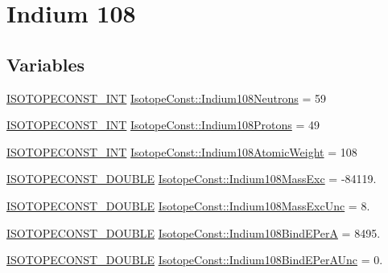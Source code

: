 \hypertarget{group___isotope_const-_indium-_in108}{}\section{Indium 108}
\label{group___isotope_const-_indium-_in108}
\subsection*{Variables}
\begin{DoxyCompactItemize}
\item 
\mbox{\hyperlink{group___isotope_const-_macros_ga5f18360b3e99483a35c32d789e62621c}{I\+S\+O\+T\+O\+P\+E\+C\+O\+N\+S\+T\+\_\+\+I\+NT}} \mbox{\hyperlink{group___isotope_const-_indium-_in108_ga9cdebc94fcaac56b9bc00c0afaffdd4a}{Isotope\+Const\+::\+Indium108\+Neutrons}} = 59
\item 
\mbox{\hyperlink{group___isotope_const-_macros_ga5f18360b3e99483a35c32d789e62621c}{I\+S\+O\+T\+O\+P\+E\+C\+O\+N\+S\+T\+\_\+\+I\+NT}} \mbox{\hyperlink{group___isotope_const-_indium-_in108_ga1b01530438efdb05eee2129b96b8da7d}{Isotope\+Const\+::\+Indium108\+Protons}} = 49
\item 
\mbox{\hyperlink{group___isotope_const-_macros_ga5f18360b3e99483a35c32d789e62621c}{I\+S\+O\+T\+O\+P\+E\+C\+O\+N\+S\+T\+\_\+\+I\+NT}} \mbox{\hyperlink{group___isotope_const-_indium-_in108_gaf2cebcb1879062ea235c30abe8477615}{Isotope\+Const\+::\+Indium108\+Atomic\+Weight}} = 108
\item 
\mbox{\hyperlink{group___isotope_const-_macros_ga8f45a7272ce02c0b4c65c44636ed719a}{I\+S\+O\+T\+O\+P\+E\+C\+O\+N\+S\+T\+\_\+\+D\+O\+U\+B\+LE}} \mbox{\hyperlink{group___isotope_const-_indium-_in108_gaada979f8f3d008eef46f0f3e8337961c}{Isotope\+Const\+::\+Indium108\+Mass\+Exc}} = -\/84119.
\item 
\mbox{\hyperlink{group___isotope_const-_macros_ga8f45a7272ce02c0b4c65c44636ed719a}{I\+S\+O\+T\+O\+P\+E\+C\+O\+N\+S\+T\+\_\+\+D\+O\+U\+B\+LE}} \mbox{\hyperlink{group___isotope_const-_indium-_in108_ga971d59d882a912bfadc05a2c278ce50d}{Isotope\+Const\+::\+Indium108\+Mass\+Exc\+Unc}} = 8.
\item 
\mbox{\hyperlink{group___isotope_const-_macros_ga8f45a7272ce02c0b4c65c44636ed719a}{I\+S\+O\+T\+O\+P\+E\+C\+O\+N\+S\+T\+\_\+\+D\+O\+U\+B\+LE}} \mbox{\hyperlink{group___isotope_const-_indium-_in108_gae1036e671bbc8ab9286cfac1101d7cc3}{Isotope\+Const\+::\+Indium108\+Bind\+E\+PerA}} = 8495.
\item 
\mbox{\hyperlink{group___isotope_const-_macros_ga8f45a7272ce02c0b4c65c44636ed719a}{I\+S\+O\+T\+O\+P\+E\+C\+O\+N\+S\+T\+\_\+\+D\+O\+U\+B\+LE}} \mbox{\hyperlink{group___isotope_const-_indium-_in108_ga53983ca55f4d5ee0746473267153cc20}{Isotope\+Const\+::\+Indium108\+Bind\+E\+Per\+A\+Unc}} = 0.

\end{DoxyCompactItemize}
